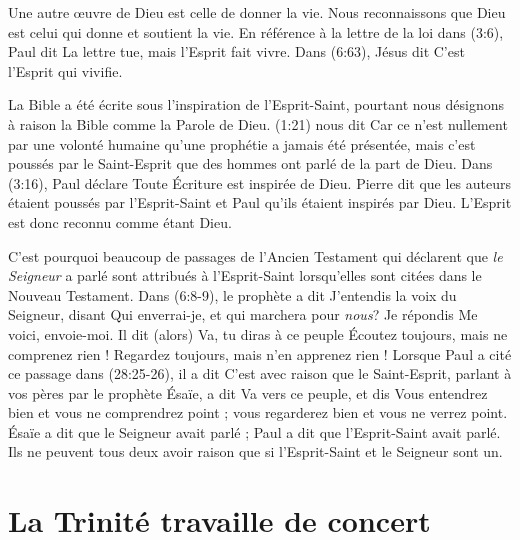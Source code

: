 Une autre œuvre de Dieu est celle de donner la vie. Nous reconnaissons que Dieu
 est celui qui donne et soutient la vie.
 En référence à la lettre de la loi dans (3:6),
 Paul dit\frcolon{} \Og La lettre tue, mais l'Esprit fait vivre. \Fg{}
 Dans (6:63), Jésus dit\frcolon{} \Og C'est l'Esprit qui vivifie.\Fg{}

La Bible a été écrite sous l'inspiration de l'Esprit-Saint, pourtant nous
 désignons à raison la Bible comme la Parole de Dieu.
 (1:21) nous dit\frcolon{}
 \Og Car ce n'est nullement par une volonté humaine qu'une prophétie a jamais
 été présentée, mais c'est poussés par le Saint-Esprit que des hommes ont parlé
 de la part de Dieu. \Fg{}
 Dans (3:16), Paul déclare\frcolon{}
 \Og Toute Écriture est inspirée de Dieu. \Fg{}
 Pierre dit que les auteurs étaient poussés par l'Esprit-Saint et Paul qu'ils
 étaient inspirés par Dieu. L'Esprit est donc reconnu comme étant Dieu.

C'est pourquoi beaucoup de passages de l'Ancien Testament qui déclarent que
 \emph{le Seigneur} a parlé sont attribués à l'Esprit-Saint lors\-qu'elles
 sont citées dans le Nouveau Testament.
 Dans (6:8-9), le prophète a dit\frcolon{} \Og J'entendis la voix du
 Seigneur, disant\frcolon{} Qui enverrai-je, et qui marchera pour \emph{nous}? Je répondis\frcolon{}
 Me voici, envoie-moi. Il dit (alors)\frcolon{} Va, tu diras à ce peuple\frcolon{}
 Écoutez toujours, mais ne comprenez rien ! Regardez toujours, mais n'en
 apprenez rien ! \Fg{}
 Lorsque Paul a cité ce passage dans (28:25-26), il a dit\frcolon{}
 \Og C'est avec raison que le Saint-Esprit, parlant à vos pères par le
 prophète Ésaïe, a dit\frcolon{} Va vers ce peuple, et dis\frcolon{} Vous entendrez bien et
 vous ne comprendrez point ; vous regarderez bien et vous ne verrez point. \Fg{}
 Ésaïe a dit que le Seigneur avait parlé ; Paul a dit que l'Esprit-Saint
 avait parlé.
 Ils ne peuvent tous deux avoir raison que si l'Esprit-Saint et le Seigneur sont un.


\section{La Trinit\'e travaille de concert}

